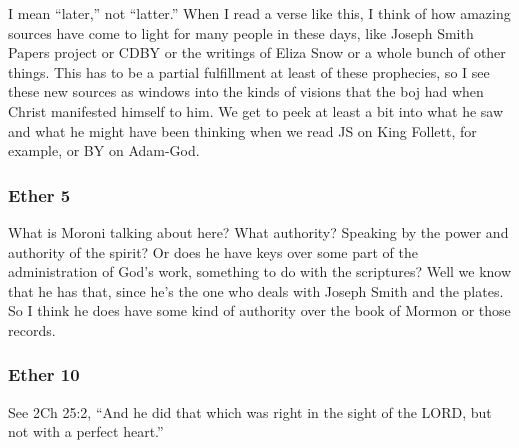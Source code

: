 		\begin{compactdesc}
		
		\item[7$\vert$]
		\begin{compactdesc}
		\item[revelations unfolding in later days] I mean ``later,'' not ``latter.'' When I read a verse like this, I think of how amazing sources have come to light for many people in these days, like Joseph Smith Papers project or CDBY or the writings of Eliza Snow or a whole bunch of other things. This has to be a partial fulfillment at least of these prophecies, so I see these new sources as windows into the kinds of visions that the boj had when Christ manifested himself to him. We get to peek at least a bit into what he saw and what he might have been thinking when we read JS on King Follett, for example, or BY on Adam-God.
		\end{compactdesc}
		
		\end{compactdesc}
		
	\subsubsection{Ether 5} %
	
		\begin{compactdesc}
		
		\item[6$\vert$]
		\begin{compactdesc}
		\item[authority] What is Moroni talking about here? What authority? Speaking by the power and authority of the spirit? Or does he have keys over some part of the administration of God's work, something to do with the scriptures? Well we know that he has that, since he's the one who deals with Joseph Smith and the plates. So I think he does have some kind of authority over the book of Mormon or those records.
		\end{compactdesc}
		
		\end{compactdesc}

	\subsubsection{Ether 10} %

		\begin{compactdesc}
		
		\item[11$\vert$]
		\begin{compactdesc}
		\item[but not unto himself] See 2Ch 25:2, ``And he did that which was right in the sight of the LORD, but not with a perfect heart.''
		\end{compactdesc}
		
		\end{compactdesc}
		
